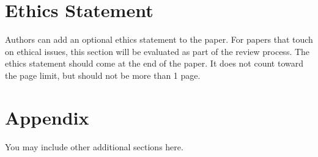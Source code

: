 \documentclass{article} %
\begin{document}
\section*{Ethics Statement}
Authors can add an optional ethics statement to the paper. 
For papers that touch on ethical issues, this section will be evaluated as part of the review process. The ethics statement should come at the end of the paper. It does not count toward the page limit, but should not be more than 1 page. 






\appendix
\section{Appendix}
You may include other additional sections here.
\end{document}

